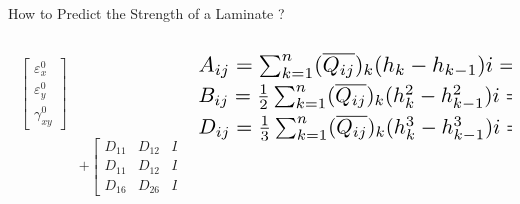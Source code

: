 \documentclass{beamer}
\begin{document}
\begin{frame}{How to Predict the Strength of a Laminate ?\hfill }
\begin{columns}[c]
\begin{column}{0.6\textwidth}
\begin{equation}
\begin{array}{l}
\begin{aligned}
\begin{bmatrix}
				\varepsilon_x^0 \\
				\varepsilon_y^0 \\
				\gamma_{xy}^0
			\end{bmatrix} \\ 
			&+  
			\begin{bmatrix}
				D_{11} & D_{12} & D_{16} \\
				D_{11} & D_{12} & D_{16} \\
				D_{16} & D_{26} & D_{66} 
			\end{bmatrix}
			\begin{bmatrix}
				k_x \\
				k_y \\
				k_{xy} 
			\end{bmatrix}
		\end{aligned}
			\end{array}
		\end{equation}
	\end{column}
	\begin{column}{0.4\textwidth}
		\begin{equation}
			\begin{split}
			&	\resizebox{1.0\linewidth}{!}{$A_{ij}=\sum_{k=1}^{n}(\overline{Q_{ij}})_k(h_k-h_{k-1})  i=1,2,6, j=1,2,6,$}\\
			&	\resizebox{1.0\linewidth}{!}{$B_{ij}=\frac{1}{2}\sum_{k=1}^{n}(\overline{Q_{ij}})_k(h_k^2 - h_{k-1}^2)
			i=1,2,6, j=1,2,6,$}\\
			&   \resizebox{1.0\linewidth}{!}{$D_{ij}=\frac{1}{3}\sum_{k=1}^{n}(\overline{Q_{ij}})_k(h_k^3 - h_{k-1}^3)
			i=1,2,6, j=1,2,6.$}\\
			\end{split}
		\end{equation}
	\end{column}
\end{columns}
\end{frame}

\end{document}
